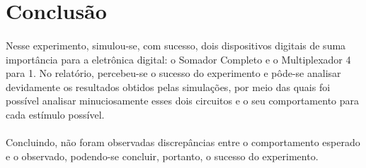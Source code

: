 \documentclass[a4paper,12pt]{article}
\begin{document}
\section{Conclusão}

\paragraph{}
Nesse experimento, simulou-se, com sucesso, dois dispositivos digitais de suma importância para a eletrônica digital: o Somador Completo e o Multiplexador 4 para 1. No relatório, percebeu-se o sucesso do experimento e pôde-se analisar devidamente os resultados obtidos pelas simulações, por meio das quais foi possível analisar minuciosamente esses dois circuitos e o seu comportamento para cada estímulo possível.

\paragraph{}
Concluindo, não foram observadas discrepâncias entre o comportamento esperado e o observado, podendo-se concluir, portanto, o sucesso do experimento.
\end{document}
